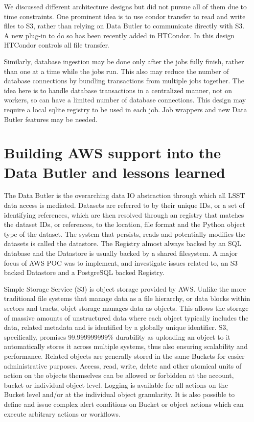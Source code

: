 We discussed different architecture designs but did not pursue all of them due to time constraints.
One prominent idea is to use condor transfer to read and write files to S3, rather than relying on Data Butler to communicate directly with S3.
A new plug-in to do so has been recently added in HTCondor.
In this design HTCondor controls all file transfer.

Similarly, database ingestion may be done only after the jobs fully finish, rather than one at a time while the jobs run.
This also may reduce the number of database connections by bundling transactions from multiple jobs together.
The idea here is to handle database transactions in a centralized manner, not on workers, so can have a limited number of database connections.
This design may require a local sqlite registry to be used in each job.
Job wrappers and new Data Butler features may be needed.


\section{Building AWS support into the Data Butler and lessons learned}

The Data Butler is the overarching data IO abstraction through which all LSST data access is mediated. Datasets are referred to by their unique IDs, or a set of identifying references, which are then resolved through an registry that matches the dataset IDs, or references, to the location, file format and the Python object type of the dataset. The system that persists, reads and potentially modifies the datasets is called the datastore. The Registry almost always backed by an SQL database and the Datastore is usually backed by a shared filesystem. A major focus of AWS POC was to implement, and investigate issues related to, an S3 backed Datastore and a PostgreSQL backed Registry.

Simple Storage Service (S3) is object storage provided by AWS. Unlike the more traditional file systems that manage data as a file hierarchy, or data blocks within sectors and tracts, objet storage manages data as objects. This allows the storage of massive amounts of unstructured data where each object typically includes the data, related metadata and is identified by a globally unique identifier. S3, specifically, promises 99.999999999\% durability as uploading an object to it automatically stores it across multiple systems, thus also ensuring scalability and performance. Related objects are generally stored in the same Buckets for easier administrative purposes. Access, read, write, delete and other atomical units of action on the objects themselves can be allowed or forbidden at the account, bucket or individual object level. Logging is available for all actions on the Bucket level and/or at the individual object granularity. It is also possible to define and issue complex alert conditions on Bucket or object actions which can execute arbitrary actions or workflows.

